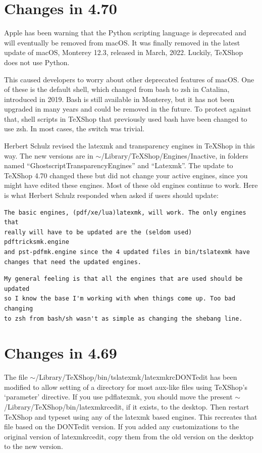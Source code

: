 \documentclass[11pt, oneside]{amsart}
\begin{document}
\section{Changes in 4.70}
Apple has been warning that the Python scripting language is deprecated and will eventually be removed from macOS.
It was finally removed in the latest update of macOS, Monterey 12.3, released in March, 2022. Luckily, TeXShop does not use Python. 

This caused developers to worry about other deprecated features of macOS. One of these is the default shell, which changed from bash to zsh in Catalina, introduced in 2019. Bash is still available in Monterey, but it has not been upgraded in many years and could be removed in the future. To protect against that, shell scripts in TeXShop that previously used bash have been changed to use zsh. In most cases, the switch was trivial.

Herbert Schulz revised the latexmk and transparency engines in TeXShop in this way. The new versions are in
$\sim$/Library/TeXShop/Engines/Inactive, in folders named ``GhostscriptTransparencyEngines'' and ``Latexmk''. The update to TeXShop 4.70 changed these but did not change your active engines, since you might have edited these engines. Most of these old engines  continue to work. Here is what Herbert Schulz responded when asked if users should update:

\begin{verbatim}
The basic engines, (pdf/xe/lua)latexmk, will work. The only engines that 
really will have to be updated are the (seldom used) pdftricksmk.engine 
and pst-pdfmk.engine since the 4 updated files in bin/tslatexmk have 
changes that need the updated engines.
\end{verbatim}

\begin{verbatim}
My general feeling is that all the engines that are used should be updated 
so I know the base I'm working with when things come up. Too bad changing 
to zsh from bash/sh wasn't as simple as changing the shebang line.
\end{verbatim}

\section{Changes in 4.69}

The file $\sim$/Library/TeXShop/bin/tslatexmk/latexmkrcDONTedit has been modified  to allow setting of a directory for most aux-like files using TeXShop's `parameter' directive. 
If you use pdflatexmk, you should move the present $\sim$/Library/TeXShop/bin/latexmkrcedit,  if it exists, to the desktop. Then restart TeXShop and typeset using any of the latexmk based engines. This recreates that file based on the DONTedit version. If you added any customizations to the original version of latexmkrcedit, copy them from the old version on the desktop to the new version.
\end{document}
